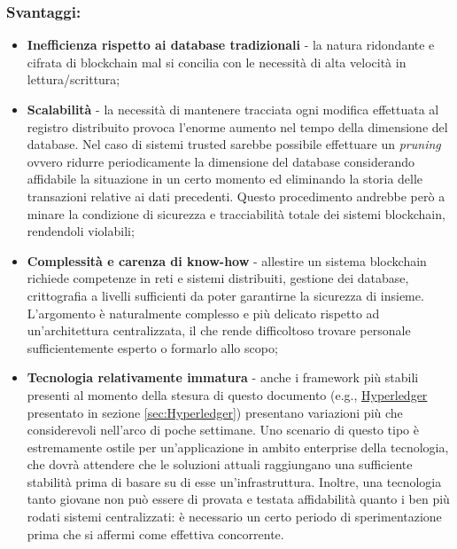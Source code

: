 		\subsubsection{Svantaggi:}
			\begin{itemize}
				\item \textbf{Inefficienza rispetto ai database tradizionali} - la natura ridondante e cifrata di blockchain mal si concilia con le necessità di alta velocità in lettura/scrittura;
				\item \textbf{Scalabilità} - la necessità di mantenere tracciata ogni modifica effettuata al registro distribuito provoca l'enorme aumento nel tempo della dimensione del database. Nel caso di sistemi trusted sarebbe possibile effettuare un \emph{pruning}\label{pruning} ovvero ridurre periodicamente la dimensione del database considerando affidabile la situazione in un certo momento ed eliminando la storia delle transazioni relative ai dati precedenti. Questo procedimento andrebbe però a minare la condizione di sicurezza e tracciabilità totale dei sistemi blockchain, rendendoli violabili;
				\item \textbf{Complessità e carenza di know-how} - allestire un sistema blockchain richiede competenze in reti e sistemi distribuiti, gestione dei database, crittografia a livelli sufficienti da poter garantirne la sicurezza di insieme. L'argomento è naturalmente complesso e più delicato rispetto ad un'architettura centralizzata, il che rende difficoltoso trovare personale sufficientemente esperto o formarlo allo scopo;
				\item \textbf{Tecnologia relativamente immatura} - anche i framework più stabili presenti al momento della stesura di questo documento (e.g., \hyperref[sec:Hyperledger]{Hyperledger} presentato in sezione \ref{sec:Hyperledger}) presentano variazioni più che considerevoli nell'arco di poche settimane. Uno scenario di questo tipo è estremamente ostile per un'applicazione in ambito enterprise della tecnologia, che dovrà attendere che le soluzioni attuali raggiungano una sufficiente stabilità prima di basare su di esse un'infrastruttura. Inoltre, una tecnologia tanto giovane non può essere di provata e testata affidabilità quanto i ben più rodati sistemi centralizzati: è necessario un certo periodo di sperimentazione prima che si affermi come effettiva concorrente.
			\end{itemize}
		
